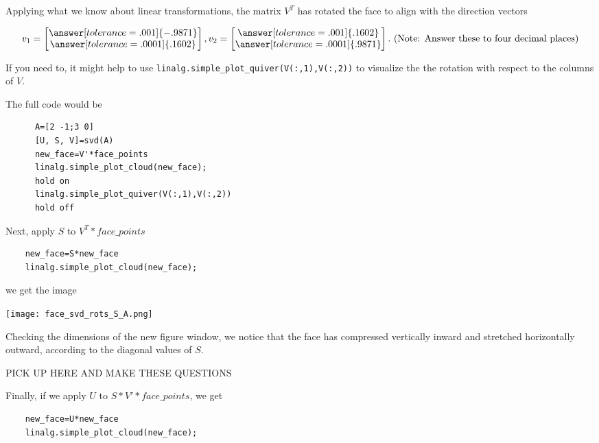 \documentclass{ximera}
\begin{document}
\begin{problem}
  Applying what we know about linear transformations, the matrix $V^T$ has rotated the face to align with the direction vectors

  

  $$v_1=\begin{bmatrix}\answer[tolerance=.001]{-.9871}\\\answer[tolerance=.0001]{.1602}\end{bmatrix}, v_2=\begin{bmatrix}\answer[tolerance=.001]{.1602}\\\answer[tolerance=.0001]{.9871}\end{bmatrix}. \text{ (Note: Answer these to four decimal places)}$$

  \begin{feedback}
    If you need to, it might help to use \texttt{linalg.simple\_plot\_quiver(V(:,1),V(:,2))} to visualize the the rotation with respect to the columns of $V$.

    The full code would be


    \begin{verbatim}
      A=[2 -1;3 0]
      [U, S, V]=svd(A)
      new_face=V'*face_points
      linalg.simple_plot_cloud(new_face);
      hold on
      linalg.simple_plot_quiver(V(:,1),V(:,2))
      hold off
    \end{verbatim}
  \end{feedback}

  
  Next, apply $S$ to $V^T*face\_points$

  \begin{verbatim}
    new_face=S*new_face
    linalg.simple_plot_cloud(new_face);
  \end{verbatim}

  we get the image

    \begin{center}
      \texttt{[image: face\_svd\_rots\_S\_A.png]}
    \end{center}

  Checking the dimensions of the new figure window, we notice that the face has compressed vertically inward and stretched horizontally outward, according to the diagonal values of $S$.

  PICK UP HERE AND MAKE THESE QUESTIONS

  Finally, if we apply $U$ to $S*V'*face\_points$, we get 

  \begin{verbatim}
    new_face=U*new_face
    linalg.simple_plot_cloud(new_face);
  \end{verbatim}


\end{problem}
\end{document}
